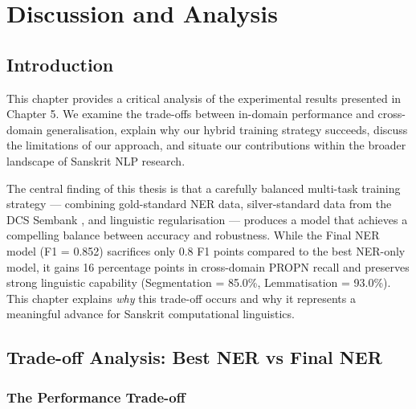 
\chapter{Discussion and Analysis}
\label{chap:discussion}

\section{Introduction}

This chapter provides a critical analysis of the experimental results presented in Chapter 5. We examine the trade-offs between in-domain performance and cross-domain generalisation, explain why our hybrid training strategy succeeds, discuss the limitations of our approach, and situate our contributions within the broader landscape of Sanskrit NLP research.

The central finding of this thesis is that a carefully balanced multi-task training strategy \cite{caruana1997multitask, ruder2017overview} — combining gold-standard NER data, silver-standard data from the DCS Sembank \cite{hellwig2010dcs, hellwig2025sembank}, and linguistic regularisation — produces a model that achieves a compelling balance between accuracy and robustness. While the Final NER model (F1 = 0.852) sacrifices only 0.8 F1 points compared to the best NER-only model, it gains 16 percentage points in cross-domain PROPN recall and preserves strong linguistic capability (Segmentation = 85.0\%, Lemmatisation = 93.0\%). This chapter explains \textit{why} this trade-off occurs and why it represents a meaningful advance for Sanskrit computational linguistics.

\section{Trade-off Analysis: Best NER vs Final NER}

\subsection{The Performance Trade-off}

